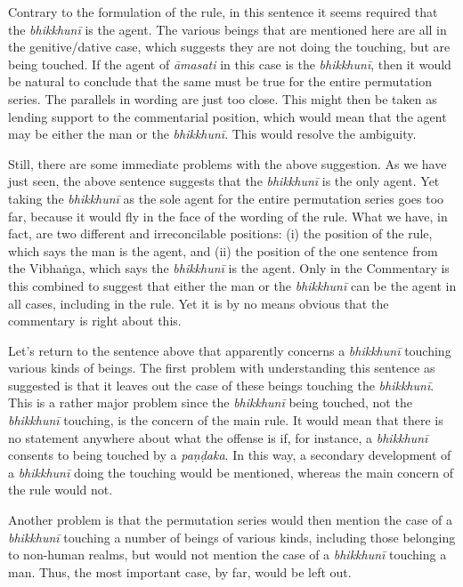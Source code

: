 \documentclass[12pt,openany]{book}%
\begin{document}
Contrary to the formulation of the rule, in this sentence it seems required that the \textit{\textsanskrit{bhikkhunī}} is the agent. The various beings that are mentioned here are all in the genitive/dative case, which suggests they are not doing the touching, but are being touched. If the agent of \textit{\textsanskrit{āmasati}} in this case is the \textit{\textsanskrit{bhikkhunī}}, then it would be natural to conclude that the same must be true for the entire permutation series. The parallels in wording are just too close. This might then be taken as lending support to the commentarial position, which would mean that the agent may be either the man or the \textit{\textsanskrit{bhikkhunī}}. This would resolve the ambiguity.

Still, there are some immediate problems with the above suggestion. As we have just seen, the above sentence suggests that the \textit{\textsanskrit{bhikkhunī}} is the only agent. Yet taking the \textit{\textsanskrit{bhikkhunī}} as the sole agent for the entire permutation series goes too far, because it would fly in the face of the wording of the rule. What we have, in fact, are two different and irreconcilable positions: (i) the position of the rule, which says the man is the agent, and (ii) the position of the one sentence from the \textsanskrit{Vibhaṅga}, which says the \textit{\textsanskrit{bhikkhunī}} is the agent. Only in the Commentary is this combined to suggest that either the man or the \textit{\textsanskrit{bhikkhunī}} can be the agent in all cases, including in the rule. Yet it is by no means obvious that the commentary is right about this.

Let’s return to the sentence above that apparently concerns a \textit{\textsanskrit{bhikkhunī}} touching various kinds of beings. The first problem with understanding this sentence as suggested is that it leaves out the case of these beings touching the \textit{\textsanskrit{bhikkhunī}}. This is a rather major problem since the \textit{\textsanskrit{bhikkhunī}} being touched, not the \textit{\textsanskrit{bhikkhunī}} touching, is the concern of the main rule. It would mean that there is no statement anywhere about what the offense is if, for instance, a \textit{\textsanskrit{bhikkhunī}} consents to being touched by a \textit{\textsanskrit{paṇḍaka}}. In this way, a secondary development of a \textit{\textsanskrit{bhikkhunī}} doing the touching would be mentioned, whereas the main concern of the rule would not.

Another problem is that the permutation series would then mention the case of a \textit{\textsanskrit{bhikkhunī}} touching a number of beings of various kinds, including those belonging to non-human realms, but would not mention the case of a \textit{\textsanskrit{bhikkhunī}} touching a man. Thus, the most important case, by far, would be left out.
\end{document}
